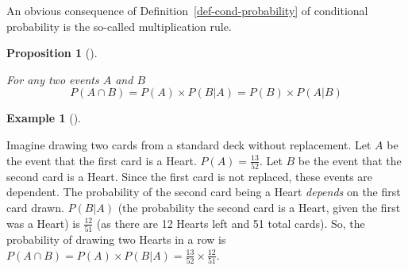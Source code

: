 \documentclass[
  letterpaper,
  DIV=11,
  numbers=noendperiod]{scrreport}
\theoremstyle{definition}
\newtheorem{example}{Example}[chapter]
\theoremstyle{plain}
\theoremstyle{plain}
\newtheorem{proposition}{Proposition}[chapter]
\theoremstyle{definition}
\theoremstyle{remark}
\begin{document}
An obvious consequence of Definition~\ref{def-cond-probability} of
conditional probability is the so-called multiplication rule.

\begin{tcolorbox}[enhanced jigsaw, opacitybacktitle=0.6, bottomtitle=1mm, opacityback=0, toprule=.15mm, colbacktitle=quarto-callout-note-color!10!white, colback=white, left=2mm, title={Multiplication Rule}, breakable, rightrule=.15mm, leftrule=.75mm, titlerule=0mm, colframe=quarto-callout-note-color-frame, arc=.35mm, coltitle=black, toptitle=1mm, bottomrule=.15mm]

\begin{proposition}[]\protect\hypertarget{prp-multiplication-rule}{}\label{prp-multiplication-rule}

For any two events \(A\) and \(B\)
\[ P(A \cap B) = P(A) \times P(B|A) = P(B) \times P(A|B) \]

\end{proposition}

\end{tcolorbox}

\begin{tcolorbox}[enhanced jigsaw, opacitybacktitle=0.6, bottomtitle=1mm, opacityback=0, toprule=.15mm, colbacktitle=quarto-callout-note-color!10!white, colback=white, left=2mm, title={Drawing Cards without Replacement}, breakable, rightrule=.15mm, leftrule=.75mm, titlerule=0mm, colframe=quarto-callout-note-color-frame, arc=.35mm, coltitle=black, toptitle=1mm, bottomrule=.15mm]

\begin{example}[]\protect\hypertarget{exm-drawing-cards-dependence}{}\label{exm-drawing-cards-dependence}

Imagine drawing two cards from a standard deck without replacement. Let
\(A\) be the event that the first card is a Heart.
\(P(A) = \frac{13}{52}\). Let \(B\) be the event that the second card is
a Heart. Since the first card is not replaced, these events are
dependent. The probability of the second card being a Heart
\emph{depends} on the first card drawn. \(P(B|A)\) (the probability the
second card is a Heart, given the first was a Heart) is
\(\frac{12}{51}\) (as there are 12 Hearts left and 51 total cards). So,
the probability of drawing two Hearts in a row is
\(P(A \cap B) = P(A) \times P(B|A) = \frac{13}{52} \times \frac{12}{51}\).

\end{example}

\end{tcolorbox}
\end{document}
